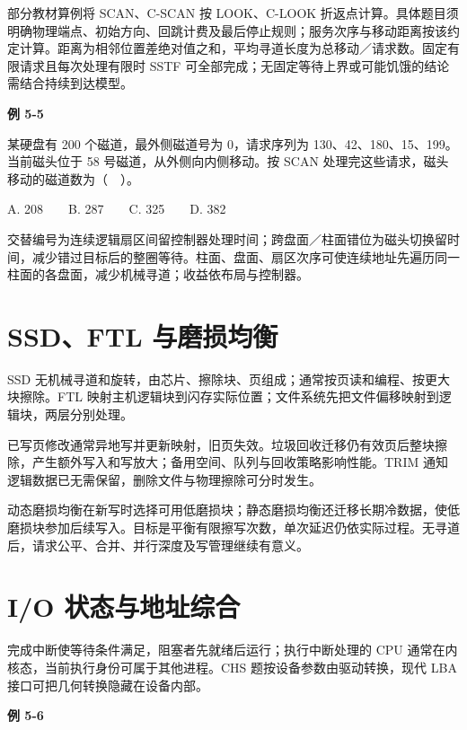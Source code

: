 部分教材算例将 SCAN、C-SCAN 按 LOOK、C-LOOK 折返点计算。具体题目须明确物理端点、初始方向、回跳计费及最后停止规则；服务次序与移动距离按该约定计算。距离为相邻位置差绝对值之和，平均寻道长度为总移动／请求数。固定有限请求且每次处理有限时 SSTF 可全部完成；无固定等待上界或可能饥饿的结论需结合持续到达模型。

\par\medskip{}\noindent\hypertarget{OS05-E05}{}\label{OS05-E05}\textbf{例 5-5}\par\nobreak\smallskip

某硬盘有 200 个磁道，最外侧磁道号为 0，请求序列为 130、42、180、15、199。当前磁头位于 58 号磁道，从外侧向内侧移动。按 SCAN 处理完这些请求，磁头移动的磁道数为（　）。

A. 208　　B. 287　　C. 325　　D. 382

交替编号为连续逻辑扇区间留控制器处理时间；跨盘面／柱面错位为磁头切换留时间，减少错过目标后的整圈等待。柱面、盘面、扇区次序可使连续地址先遍历同一柱面的各盘面，减少机械寻道；收益依布局与控制器。

\section{SSD、FTL 与磨损均衡}\label{OS05-ssd}

SSD 无机械寻道和旋转，由芯片、擦除块、页组成；通常按页读和编程、按更大块擦除。FTL 映射主机逻辑块到闪存实际位置；文件系统先把文件偏移映射到逻辑块，两层分别处理。

已写页修改通常异地写并更新映射，旧页失效。垃圾回收迁移仍有效页后整块擦除，产生额外写入和写放大；备用空间、队列与回收策略影响性能。TRIM 通知逻辑数据已无需保留，删除文件与物理擦除可分时发生。

动态磨损均衡在新写时选择可用低磨损块；静态磨损均衡还迁移长期冷数据，使低磨损块参加后续写入。目标是平衡有限擦写次数，单次延迟仍依实际过程。无寻道后，请求公平、合并、并行深度及写管理继续有意义。

\section{I/O 状态与地址综合}\label{OS05-comprehensive}

完成中断使等待条件满足，阻塞者先就绪后运行；执行中断处理的 CPU 通常在内核态，当前执行身份可属于其他进程。CHS 题按设备参数由驱动转换，现代 LBA 接口可把几何转换隐藏在设备内部。

\par\medskip{}\noindent\hypertarget{OS05-E06}{}\label{OS05-E06}\textbf{例 5-6}\par\nobreak\smallskip

